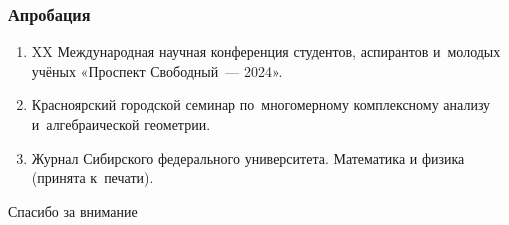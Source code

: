 \documentclass{beamer}
\begin{document}
\begin{frame}
  \frametitle{Апробация}

  \begin{enumerate}
    \item XX Международная научная конференция студентов, аспирантов и~молодых учёных «Проспект Свободный~— 2024».
    \item Красноярский городской семинар по~многомерному комплексному анализу и~алгебраической геометрии.
    \item Журнал Сибирского федерального университета. Математика и физика (принята к~печати).
  \end{enumerate}
\end{frame}

\begin{frame}
  \centering \Huge{Спасибо за внимание}
\end{frame}
\end{document}
